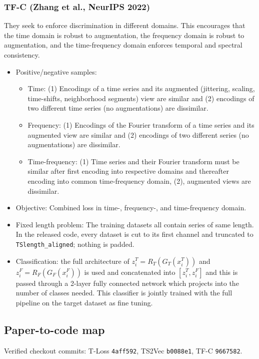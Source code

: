 \documentclass[a4paper,11pt]{article}
\newcommand{\code}[1]{\texttt{#1}}
\begin{document}
\subsubsection{TF-C (Zhang et al., NeurIPS 2022)}
They seek to enforce discrimination in different domains. This encourages that the time domain is robust to augmentation, the frequency domain is robust to augmentation, and the time-frequency domain enforces temporal and spectral consistency.

\begin{itemize}
\item Positive/negative samples: 
\begin{itemize}
\item Time: (1) Encodings of a time series and its augmented (jittering, scaling, time-shifts, neighborhood segments) view are similar and (2) encodings of two different time series (no augmentations) are dissimilar.
\item Frequency: (1) Encodings of the Fourier transform of a time series and its augmented view are similar and (2) encodings of two different series (no augmentations) are dissimilar.
\item Time-frequency: (1) Time series and their Fourier transform must be similar after first encoding into respective domains and thereafter encoding into common time-frequency domain, (2), augmented views are dissimilar.
\end{itemize}
\item Objective: Combined loss in time-, frequency-, and time-frequency domain.
\item Fixed length problem: The training datasets all contain series of same length. In the released code, every dataset is cut to its first channel and truncated to \code{TSlength\_aligned}; nothing is padded.
\item Classification: the full architecture of $z_i^T=R_T(G_T(x_i^T))$ and $z_i^F=R_F(G_F(x_i^F))$ is used and concatenated into $[z_i^T, z_i^F]$ and this is passed through a 2-layer fully connected network which projects into the number of classes needed. This classifier is jointly trained with the full pipeline on the target dataset as fine tuning.
\end{itemize}


\subsection{Paper-to-code map}
Verified checkout commits: T-Loss \code{4aff592}, TS2Vec \code{b0088e1}, TF-C \code{9667582}.
\end{document}
